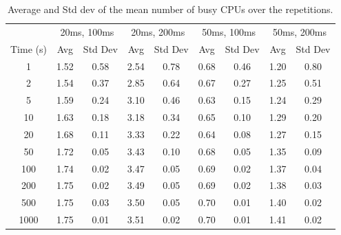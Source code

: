 \begin{table}[H]
    \centering
    \begin{tabular}{c|cc|cc|cc|cc}
                 & \multicolumn{2}{c|}{20ms, 100ms} & \multicolumn{2}{c|}{20ms, 200ms} & \multicolumn{2}{c|}{50ms, 100ms} & \multicolumn{2}{c}{50ms, 200ms}                                   \\
        Time (s) & Avg                              & Std Dev                          & Avg                              & Std Dev                         & Avg  & Std Dev & Avg  & Std Dev \\
        \midrule
        1        & 1.52                             & 0.58                             & 2.54                             & 0.78                            & 0.68 & 0.46    & 1.20 & 0.80    \\
        2        & 1.54                             & 0.37                             & 2.85                             & 0.64                            & 0.67 & 0.27    & 1.25 & 0.51    \\
        5        & 1.59                             & 0.24                             & 3.10                             & 0.46                            & 0.63 & 0.15    & 1.24 & 0.29    \\
        10       & 1.63                             & 0.18                             & 3.18                             & 0.34                            & 0.65 & 0.10    & 1.29 & 0.20    \\
        20       & 1.68                             & 0.11                             & 3.33                             & 0.22                            & 0.64 & 0.08    & 1.27 & 0.15    \\
        50       & 1.72                             & 0.05                             & 3.43                             & 0.10                            & 0.68 & 0.05    & 1.35 & 0.09    \\
        100      & 1.74                             & 0.02                             & 3.47                             & 0.05                            & 0.69 & 0.02    & 1.37 & 0.04    \\
        200      & 1.75                             & 0.02                             & 3.49                             & 0.05                            & 0.69 & 0.02    & 1.38 & 0.03    \\
        500      & 1.75                             & 0.03                             & 3.50                             & 0.05                            & 0.70 & 0.01    & 1.40 & 0.02    \\
        1000     & 1.75                             & 0.01                             & 3.51                             & 0.02                            & 0.70 & 0.01    & 1.41 & 0.02    \\
    \end{tabular}
    \caption{Average and Std dev of the mean number of busy CPUs over the repetitions.}
    \label{tab:stabilization}
\end{table}

